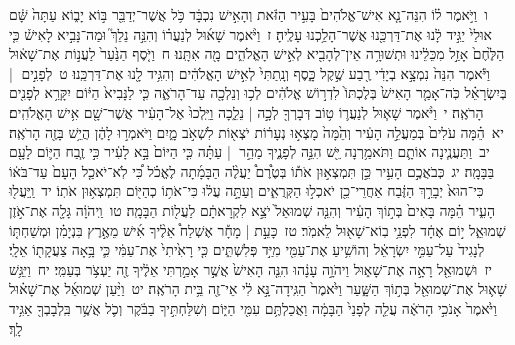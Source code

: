 \documentclass[18pt]{article}
\newcommand{\vart}[1]{\Bfootnote{#1}}	%
\begin{document}
 {\loc ו~}וַיֹּ֣אמֶר ל֗וֹ הִנֵּה־נָ֤א אִישׁ־אֱלֹהִים֙ בָּעִ֣יר הַזֹּ֔את וְהָאִ֣ישׁ נִכְבָּ֔ד כֹּ֥ל אֲשֶׁר־יְדַבֵּ֖ר בּ֣וֹא יָב֑וֹא עַתָּה֙  \edtext{נֵ֣לְכָה}{\vart{א=נֵ֣לֲכָה | }}  שָּׁ֔ם אוּלַי֙ יַגִּ֣יד לָ֔נוּ אֶת־דַּרְכֵּ֖נוּ אֲשֶׁר־הָלַ֥כְנוּ עָלֶֽיהָ׃ \startlock
 {\loc ז~}וַיֹּ֨אמֶר שָׁא֜וּל לְנַעֲר֗וֹ וְהִנֵּ֣ה נֵלֵךְ֮ וּמַה־נָּבִ֣יא לָאִישׁ֒ כִּ֤י הַלֶּ֙חֶם֙ אָזַ֣ל מִכֵּלֵ֔ינוּ וּתְשׁוּרָ֥ה אֵין־לְהָבִ֖יא לְאִ֣ישׁ הָאֱלֹהִ֑ים מָ֖ה אִתָּֽנוּ׃ \startlock
 {\loc ח~}וַיֹּ֤סֶף הַנַּ֙עַר֙ לַעֲנ֣וֹת אֶת־שָׁא֔וּל וַיֹּ֕אמֶר הִנֵּה֙ נִמְצָ֣א בְיָדִ֔י רֶ֖בַע שֶׁ֣קֶל כָּ֑סֶף וְנָֽתַתִּי֙ לְאִ֣ישׁ הָאֱלֹהִ֔ים וְהִגִּ֥יד לָ֖נוּ אֶת־דַּרְכֵּֽנוּ׃ \startlock
 {\loc ט~}לְפָנִ֣ים  |  בְּיִשְׂרָאֵ֗ל כֹּֽה־אָמַ֤ר הָאִישׁ֙ בְּלֶכְתּוֹ֙ לִדְר֣וֹשׁ אֱלֹהִ֔ים לְכ֥וּ וְנֵלְכָ֖ה עַד־הָרֹאֶ֑ה כִּ֤י לַנָּבִיא֙ הַיּ֔וֹם יִקָּרֵ֥א לְפָנִ֖ים הָרֹאֶֽה׃ \startlock
 {\loc י~}וַיֹּ֨אמֶר שָׁא֧וּל לְנַעֲר֛וֹ ט֥וֹב דְּבָרְךָ֖ לְכָ֣ה  |  נֵלֵ֑כָה וַיֵּֽלְכוּ֙ אֶל־הָעִ֔יר אֲשֶׁר־שָׁ֖ם אִ֥ישׁ הָאֱלֹהִֽים׃ \startlock
 {\loc יא~}הֵ֗מָּה עֹלִים֙ בְּמַעֲלֵ֣ה הָעִ֔יר וְהֵ֙מָּה֙ מָצְא֣וּ נְעָר֔וֹת יֹצְא֖וֹת לִשְׁאֹ֣ב מָ֑יִם וַיֹּאמְר֣וּ לָהֶ֔ן הֲיֵ֥שׁ בָּזֶ֖ה הָרֹאֶֽה׃ \startlock
 {\loc יב~}וַתַּעֲנֶ֧ינָה אוֹתָ֛ם וַתֹּאמַ֥רְנָה יֵּ֖שׁ הִנֵּ֣ה לְפָנֶ֑יךָ מַהֵ֣ר  |  עַתָּ֗ה כִּ֤י הַיּוֹם֙ בָּ֣א לָעִ֔יר כִּ֣י זֶ֧בַח הַיּ֛וֹם לָעָ֖ם בַּבָּמָֽה׃ \startlock
 {\loc יג~}כְּבֹאֲכֶ֣ם הָעִ֣יר כֵּ֣ן תִּמְצְא֣וּן אֹת֡וֹ בְּטֶ֩רֶם֩ יַעֲלֶ֨ה הַבָּמָ֜תָה לֶאֱכֹ֗ל כִּ֠י לֹֽא־יֹאכַ֤ל הָעָם֙ עַד־בֹּא֔וֹ כִּי־הוּא֙ יְבָרֵ֣ךְ הַזֶּ֔בַח אַחֲרֵי־כֵ֖ן יֹאכְל֣וּ הַקְּרֻאִ֑ים וְעַתָּ֣ה עֲל֔וּ כִּי־אֹת֥וֹ כְהַיּ֖וֹם תִּמְצְא֥וּן אֹתֽוֹ׃ \startlock
 {\loc יד~}וַֽיַּעֲל֖וּ הָעִ֑יר הֵ֗מָּה בָּאִים֙ בְּת֣וֹךְ הָעִ֔יר וְהִנֵּ֤ה שְׁמוּאֵל֙ יֹצֵ֣א לִקְרָאתָ֔ם לַעֲל֖וֹת הַבָּמָֽה׃ \startlock
 {\loc טו~}וַֽיהֹוָ֔ה גָּלָ֖ה אֶת־אֹ֣זֶן שְׁמוּאֵ֑ל י֣וֹם אֶחָ֔ד לִפְנֵ֥י בֽוֹא־שָׁא֖וּל לֵאמֹֽר׃ \startlock
 {\loc טז~}כָּעֵ֣ת  |  מָחָ֡ר אֶשְׁלַח֩ אֵלֶ֨יךָ אִ֜ישׁ מֵאֶ֣רֶץ בִּנְיָמִ֗ן וּמְשַׁחְתּ֤וֹ לְנָגִיד֙ עַל־עַמִּ֣י יִשְׂרָאֵ֔ל וְהוֹשִׁ֥יעַ אֶת־עַמִּ֖י מִיַּ֣ד פְּלִשְׁתִּ֑ים כִּ֤י רָאִ֙יתִי֙ אֶת־עַמִּ֔י כִּ֛י בָּ֥אָה צַעֲקָת֖וֹ אֵלָֽי׃ \startlock
 {\loc יז~}וּשְׁמוּאֵ֖ל רָאָ֣ה אֶת־שָׁא֑וּל וַיהֹוָ֣ה עָנָ֔הוּ הִנֵּ֤ה הָאִישׁ֙ אֲשֶׁ֣ר אָמַ֣רְתִּי אֵלֶ֔יךָ זֶ֖ה יַעְצֹ֥ר בְּעַמִּֽי׃ \startlock
 {\loc יח~}וַיִּגַּ֥שׁ שָׁא֛וּל אֶת־שְׁמוּאֵ֖ל בְּת֣וֹךְ הַשָּׁ֑עַר וַיֹּ֙אמֶר֙ הַגִּֽידָה־נָּ֣א לִ֔י אֵי־זֶ֖ה בֵּ֥ית הָרֹאֶֽה׃ \startlock
 {\loc יט~}וַיַּ֨עַן שְׁמוּאֵ֜ל אֶת־שָׁא֗וּל וַיֹּ֙אמֶר֙ אָנֹכִ֣י הָרֹאֶ֔ה עֲלֵ֤ה לְפָנַי֙ הַבָּמָ֔ה וַאֲכַלְתֶּ֥ם עִמִּ֖י הַיּ֑וֹם וְשִׁלַּחְתִּ֣יךָ בַבֹּ֔קֶר וְכֹ֛ל אֲשֶׁ֥ר בִּֽלְבָבְךָ֖ אַגִּ֥יד לָֽךְ׃ \startlock
\end{document}
